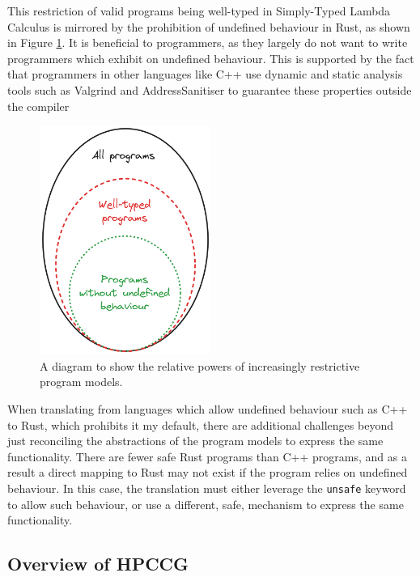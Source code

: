 This restriction of valid programs being well-typed in Simply-Typed Lambda Calculus is mirrored by the prohibition of undefined behaviour in Rust, as shown in Figure \ref{fig:excalidraw_programs_venn}. It is beneficial to programmers, as they largely do not want to write programmers which exhibit on undefined behaviour. This is supported by the fact that programmers in other languages like C++ use dynamic and static analysis tools such as Valgrind \cite{ValgrindHome} and AddressSanitiser \cite{Sanitizers2023} to guarantee these properties outside the compiler

\begin{figure}[H]
    \centering
    \includegraphics[width=0.5\textwidth]{images/3_translation/excalidraw_programs_venn.png}
    \caption{A diagram to show the relative powers of increasingly restrictive program models.}
    \label{fig:excalidraw_programs_venn}
\end{figure}

When translating from languages which allow undefined behaviour such as C++ to Rust, which prohibits it my default, there are additional challenges beyond just reconciling the abstractions of the program models to express the same functionality. There are fewer safe Rust programs than C++ programs, and as a result a direct mapping to Rust may not exist if the program relies on undefined behaviour. In this case, the translation must either leverage the \texttt{unsafe} keyword to allow such behaviour, or use a different, safe, mechanism to express the same functionality.


\subsection{Overview of HPCCG}
\label{sec:overview-hpccg}

